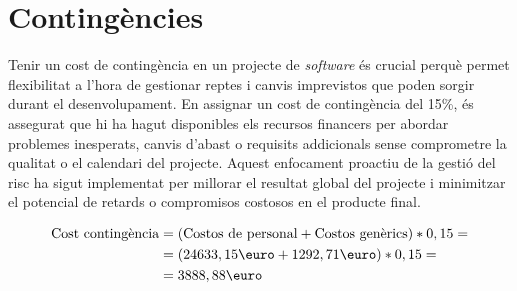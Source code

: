 \section{Contingències}
Tenir un cost de contingència en un projecte de \textit{software} és crucial perquè permet flexibilitat a l'hora de gestionar reptes i canvis imprevistos que poden sorgir durant el desenvolupament. En assignar un cost de contingència del 15\%, és assegurat que hi ha hagut disponibles els recursos financers per abordar problemes inesperats, canvis d'abast o requisits addicionals sense comprometre la qualitat o el calendari del projecte. Aquest enfocament proactiu de la gestió del risc ha sigut implementat per millorar el resultat global del projecte i minimitzar el potencial de retards o compromisos costosos en el producte final.


\begin{align*}
\text{Cost contingència} & = (\text{Costos de personal} + \text{Costos genèrics}) * 0,15 = \\
& = (24633,15\text{\euro} + 1292,71\text{\euro}) * 0,15 = \\
& =3888,88\text{\euro}
\end{align*}

